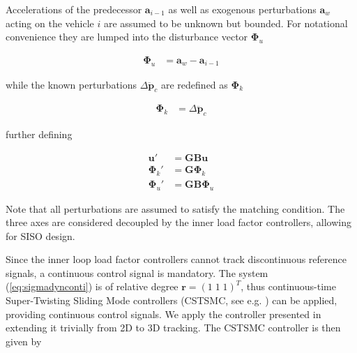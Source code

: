 \documentclass{ifacconf}
\providecommand{\mbf}[1]{\mathbf{#1}}
\begin{document}
Accelerations of the predecessor $\mbf{a}_{i-1}$ as well as exogenous perturbations $\mbf{a}_w $ acting on the vehicle $i$ are assumed to be unknown but bounded. For notational convenience they are lumped into the disturbance vector $\mbf{\Phi}_u$

\begin{align}
\mbf{\Phi}_u &= \mbf{a}_w - \mbf{a}_{i-1}
\end{align}

while the known perturbations $\Delta \ddot{\mbf{p}}_c$ are redefined as $\mbf{\Phi}_k$

\begin{align}
\mbf{\Phi}_k &= \Delta \ddot{\mbf{p}}_c
\end{align}

further defining

\begin{align}
\mbf{u}' &= \mbf{GB}\mbf{u}
\label{eq:defu}\\
\mbf{\Phi}_k' &= \mbf{G}\mbf{\Phi}_k \\
\mbf{\Phi}_u' &= \mbf{GB}\mbf{\Phi}_u
\end{align}

Note that all perturbations are assumed to satisfy the matching condition.
The three axes are considered decoupled by the inner load factor controllers, allowing for SISO design.

%
%
%

Since the inner loop load factor controllers cannot track discontinuous reference signals, a continuous control signal is mandatory.
The system (\ref{eq:sigmadynconti}) is of relative degree $\mbf{r} = (1 \; 1 \; 1)^T$, thus continuous-time Super-Twisting Sliding Mode controllers (CSTSMC, see e.g. \cite{shtessel2014sliding}) can be applied, providing continuous control signals.
We apply the controller presented in \cite{galzi2006uav} extending it trivially from 2D to 3D tracking.
The CSTSMC controller is then given by
\end{document}
